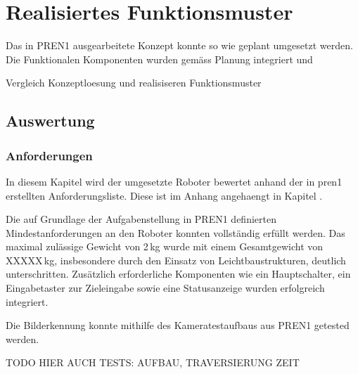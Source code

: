 \section{Realisiertes Funktionsmuster}

Das in PREN1 ausgearbeitete Konzept konnte so wie geplant umgesetzt werden. Die Funktionalen Komponenten wurden gemäss Planung integriert und 

Vergleich  Konzeptloesung und realisiseren Funktionsmuster



\subsection{Auswertung}

\subsubsection{Anforderungen}

In diesem Kapitel wird der umgesetzte Roboter bewertet anhand der in \acrshort{pren1} erstellten Anforderungsliste. Diese ist im Anhang angehaengt in Kapitel .

Die auf Grundlage der Aufgabenstellung in PREN1 definierten Mindestanforderungen an den Roboter konnten vollständig erfüllt werden. Das maximal zulässige Gewicht von 2 kg wurde mit einem Gesamtgewicht von XXXXX kg, insbesondere durch den Einsatz von Leichtbaustrukturen, deutlich unterschritten. Zusätzlich erforderliche Komponenten wie ein Hauptschalter, ein Eingabetaster zur Zieleingabe sowie eine Statusanzeige wurden erfolgreich integriert.

Die Bilderkennung konnte mithilfe des Kameratestaufbaus aus PREN1 getested werden. 


TODO HIER AUCH TESTS: AUFBAU, TRAVERSIERUNG ZEIT